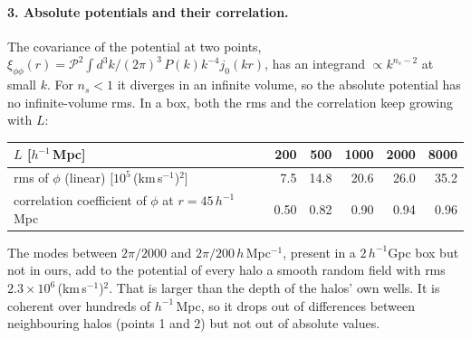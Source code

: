 \documentclass[11pt,a4paper]{article}
\newcommand{\kms}{(km\,s$^{-1}$)$^2$}
\newcommand{\Mpch}{$h^{-1}$\,Mpc}
\begin{document}
\paragraph{3. Absolute potentials and their correlation.}
The covariance of the potential at two points,
$\xi_{\phi\phi}(r)=\mathcal{P}^2\int\! d^3k/(2\pi)^3\,P(k)k^{-4}j_0(kr)$, has an integrand $\propto k^{n_s-2}$ at
small $k$. For $n_s<1$ it diverges in an infinite volume, so the absolute potential has no infinite-volume rms. In a
box, both the rms and the correlation keep growing with $L$:

\begin{table}[H]
\centering\small
\begin{tabular}{@{}lrrrrr@{}}
\toprule
$L$ [\Mpch] & 200 & 500 & 1000 & 2000 & 8000\\
\midrule
rms of $\phi$ (linear) [$10^5$\,\kms] & 7.5 & 14.8 & 20.6 & 26.0 & 35.2 \\
correlation coefficient of $\phi$ at $r=45$\,\Mpch & 0.50 & 0.82 & 0.90 & 0.94 & 0.96 \\
\bottomrule
\end{tabular}
\end{table}

The modes between $2\pi/2000$ and $2\pi/200$\,$h$\,Mpc$^{-1}$, present in a $2\,h^{-1}$Gpc box but not in ours, add
to the potential of every halo a smooth random field with rms $2.3\times10^6$\,\kms. That is larger than the depth of
the halos' own wells. It is coherent over hundreds of \Mpch, so it drops out of differences between neighbouring
halos (points 1 and 2) but not out of absolute values.
\end{document}
